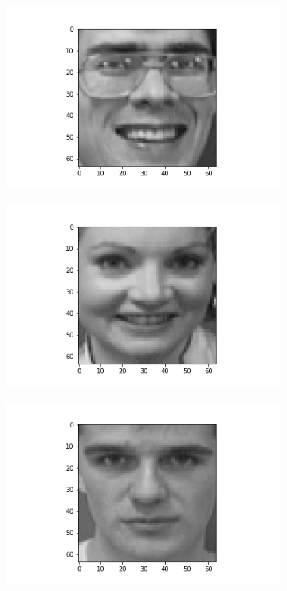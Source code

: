 \documentclass[12pt, a4paper]{article}
\begin{document}
\begin{figure}[h]
    \begin{subfigure}{0.3\linewidth}
        \centering
        \includegraphics[width=\linewidth]{images/q3/c/5/0.png}
    \end{subfigure}
    \hfill
    \begin{subfigure}{0.3\linewidth}
        \centering
        \includegraphics[width=\linewidth]{images/q3/c/5/1.png}
    \end{subfigure}
    \hfill
    \begin{subfigure}{0.3\linewidth}
        \centering
        \includegraphics[width=\linewidth]{images/q3/c/5/2.png}

\end{subfigure}
\end{figure}
\end{document}
